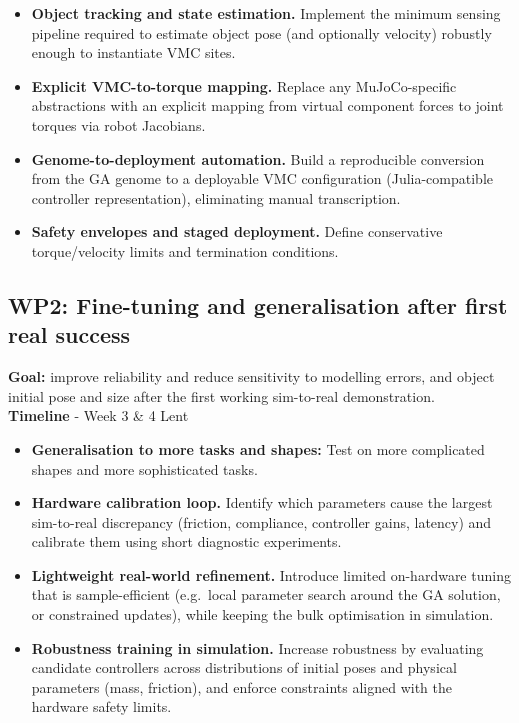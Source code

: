 \documentclass[12pt,a4paper,twocolumn]{article}
\begin{document}
\begin{itemize}
    \item \textbf{Object tracking and state estimation.} Implement the minimum sensing pipeline required to estimate object pose (and optionally velocity) robustly enough to instantiate VMC sites.
    \item \textbf{Explicit VMC-to-torque mapping.} Replace any MuJoCo-specific abstractions with an explicit mapping from virtual component forces to joint torques via robot Jacobians.
    \item \textbf{Genome-to-deployment automation.} Build a reproducible conversion from the GA genome to a deployable VMC configuration (Julia-compatible controller representation), eliminating manual transcription.
    \item \textbf{Safety envelopes and staged deployment.} Define conservative torque/velocity limits and termination conditions.
\end{itemize}

\subsection{WP2: Fine-tuning and generalisation after first real success}
\textbf{Goal:} improve reliability and reduce sensitivity to modelling errors, and object initial pose and size after the first working sim-to-real demonstration. \\
\textbf{Timeline} - Week 3 \& 4 Lent

\begin{itemize}
    \item \textbf{Generalisation to more tasks and shapes:} Test on more complicated shapes and more sophisticated tasks.
    \item \textbf{Hardware calibration loop.} Identify which parameters cause the largest sim-to-real discrepancy (friction, compliance, controller gains, latency) and calibrate them using short diagnostic experiments.
    \item \textbf{Lightweight real-world refinement.} Introduce limited on-hardware tuning that is sample-efficient (e.g.\ local parameter search around the GA solution, or constrained updates), while keeping the bulk optimisation in simulation.
    \item \textbf{Robustness training in simulation.} Increase robustness by evaluating candidate controllers across distributions of initial poses and physical parameters (mass, friction), and enforce constraints aligned with the hardware safety limits.
\end{itemize}
\end{document}
